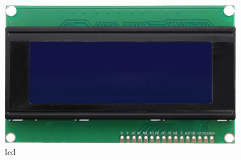 \begin{figure}[H]
	\centering
	\includegraphics[height=6cm]{./image/PESTA/material/4x20_LCD.jpg}
	\caption{\acs{lcd}}
	\label{4x20_LCD}
\end{figure}
\newpage

